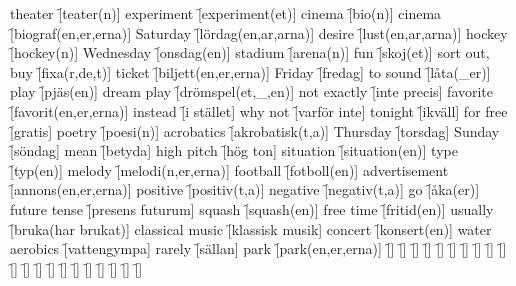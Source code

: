\begin{questions}
    \begin{multicols}{2}
        \raggedcolumns
        \question theater \f[teater(n)]
        \question experiment \f[experiment(et)]
        \question cinema \f[bio(n)]
        \question cinema \f[biograf(en,er,erna)]
        \question Saturday \f[lördag(en,ar,arna)]
        \question desire \f[lust(en,ar,arna)]
        \question hockey \f[hockey(n)]
        \question Wednesday \f[onsdag(en)]
        \question stadium \f[arena(n)]
        \question fun \f[skoj(et)]
        \question sort out, buy \f[fixa(r,de,t)]
        \question ticket \f[biljett(en,er,erna)]
        \question Friday \f[fredag]
        \question to sound \f[låta(\_er)]
        \question play \f[pjäs(en)]
        \question dream play \f[drömspel(et,\_,en)]
        \question not exactly \f[inte precis]
        \question favorite \f[favorit(en,er,erna)]
        \question instead \f[i stället]
        \question why not \f[varför inte]
        \question tonight \f[ikväll]
        \question for free \f[gratis]
        \question poetry \f[poesi(n)]
        \question acrobatics \f[akrobatisk(t,a)]
        \question Thursday \f[torsdag]
        \question Sunday \f[söndag]
        \question mean \f[betyda]
        \question high pitch \f[hög ton]
        \question situation \f[situation(en)]
        \question type \f[typ(en)]
        \question melody \f[melodi(n,er,erna)]
        \question football \f[fotboll(en)]
        \question advertisement \f[annons(en,er,erna)]
        \question positive \f[positiv(t,a)]
        \question negative \f[negativ(t,a)]
        \question go \f[åka(er)]
        \question future tense \f[presens futurum]
        \question squash \f[squash(en)]
        \question free time \f[fritid(en)]
        \question usually \f[bruka(har brukat)]
        \question classical music \f[klassisk musik]
        \question concert \f[konsert(en)]
        \question water aerobics \f[vattengympa]
        \question rarely \f[sällan]
        \question park \f[park(en,er,erna)]
        \question  \f[]
        \question  \f[]
        \question  \f[]
        \question  \f[]
        \question  \f[]
        \question  \f[]
        \question  \f[]
        \question  \f[]
        \question  \f[]
        \question  \f[]
        \question  \f[]
        \question  \f[]
        \question  \f[]
        \question  \f[]
        \question  \f[]
        \question  \f[]
        \question  \f[]
        \question  \f[]
        \question  \f[]
        \question  \f[]
        \question  \f[]
    \end{multicols}
\end{questions}

